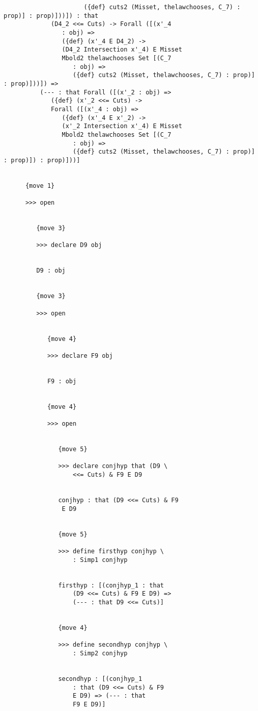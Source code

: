 \documentclass[12pt]{article}
\begin{document}
\begin{verbatim}
                      ({def} cuts2 (Misset, thelawchooses, C_7) : prop)] : prop)]))]) : that 
             (D4_2 <<= Cuts) -> Forall ([(x'_4 
                : obj) => 
                ({def} (x'_4 E D4_2) -> 
                (D4_2 Intersection x'_4) E Misset 
                Mbold2 thelawchooses Set [(C_7 
                   : obj) => 
                   ({def} cuts2 (Misset, thelawchooses, C_7) : prop)] : prop)]))]) => 
          (--- : that Forall ([(x'_2 : obj) => 
             ({def} (x'_2 <<= Cuts) -> 
             Forall ([(x'_4 : obj) => 
                ({def} (x'_4 E x'_2) -> 
                (x'_2 Intersection x'_4) E Misset 
                Mbold2 thelawchooses Set [(C_7 
                   : obj) => 
                   ({def} cuts2 (Misset, thelawchooses, C_7) : prop)] : prop)]) : prop)]))]


      {move 1}

      >>> open


         {move 3}

         >>> declare D9 obj


         D9 : obj


         {move 3}

         >>> open


            {move 4}

            >>> declare F9 obj


            F9 : obj


            {move 4}

            >>> open


               {move 5}

               >>> declare conjhyp that (D9 \
                   <<= Cuts) & F9 E D9


               conjhyp : that (D9 <<= Cuts) & F9 
                E D9


               {move 5}

               >>> define firsthyp conjhyp \
                   : Simp1 conjhyp


               firsthyp : [(conjhyp_1 : that 
                   (D9 <<= Cuts) & F9 E D9) => 
                   (--- : that D9 <<= Cuts)]


               {move 4}

               >>> define secondhyp conjhyp \
                   : Simp2 conjhyp


               secondhyp : [(conjhyp_1 
                   : that (D9 <<= Cuts) & F9 
                   E D9) => (--- : that 
                   F9 E D9)]



\end{verbatim}
\end{document}
